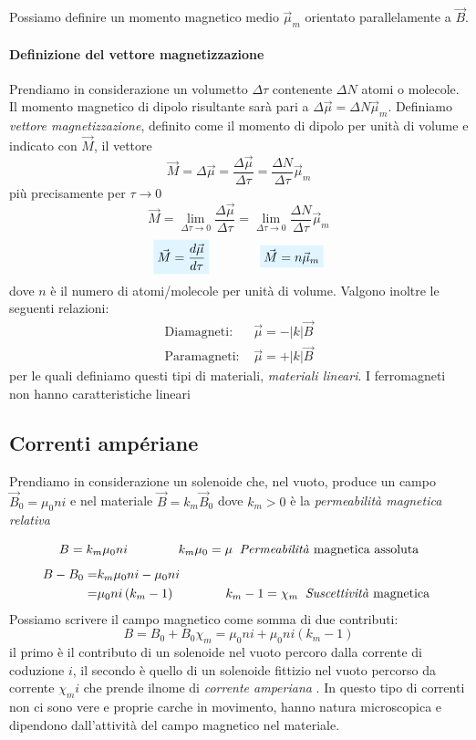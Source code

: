 \documentclass[x11names]{report}
\begin{document}
Possiamo definire un momento magnetico medio \(\vec{\mu}_m\) orientato parallelamente a \(\vec{B}\).

\paragraph{Definizione del vettore magnetizzazione}
Prendiamo in considerazione un volumetto \(\Delta\tau\) contenente \(\Delta N\) atomi o molecole. Il momento magnetico di dipolo risultante sarà pari a \(\Delta\vec{\mu} = \Delta N \vec{\mu}_m\). Definiamo \textit{vettore magnetizzazione}, definito come il momento di dipolo per unità di volume e indicato con \(\vec{M}\), il vettore
\[
\vec{M} = \Delta\vec{\mu} = \frac{\Delta \vec{\mu}}{\Delta\tau} =\frac{\Delta N}{\Delta\tau} \vec{\mu}_m
\]
più precisamente per \(\tau \to 0\)
\[
\vec{M} = \lim_{\Delta\tau \to 0}\frac{\Delta \vec{\mu}}{\Delta\tau} = \lim_{\Delta\tau \to 0}\frac{\Delta N}{\Delta\tau} \vec{\mu}_m
\]
\begin{equation}
	\viola{\vec{M}= \frac{d \vec{\mu}}{d\tau}} \qquad \qquad	\viola{\vec{M} = n\vec{\mu}_m}
\end{equation}
dove \(n\) è il numero di atomi/molecole per unità di volume. Valgono inoltre le seguenti relazioni:
\[
\begin{array}{rc}
	\text{Diamagneti: } & \vec{\mu} = - |k| \vec{B} \\
	\text{Paramagneti: } & \vec{\mu} = + |k| \vec{B}
\end{array}
\]
per le quali definiamo questi tipi di materiali, \textit{materiali lineari}. I ferromagneti non hanno caratteristiche lineari

\subsection{Correnti ampériane}
Prendiamo in considerazione un solenoide che, nel vuoto, produce un campo \(\vec{B}_0 = \mu_0 n i\) e nel materiale \(\vec{B} = k_m\vec{B}_0\) dove \(k_m > 0\) è la \textit{permeabilità magnetica relativa}

\begin{figure}[H]
	\centering
\end{figure}
\[
B = k_m \mu_0 n i \qquad \qquad k_m\mu_0 = \mu \: \text{ \textit{Permeabilità} magnetica assoluta} 
\]
\begin{align*}
	B - B_0 =&  k_m \mu_0 n i - \mu_0 n i \\
			=& \mu_0 n i\left(k_m -1\right) \qquad \qquad k_m - 1= \chi_m \: \text{ \textit{Suscettività} magnetica } \\
\end{align*}
Possiamo scrivere il campo magnetico come somma di due contributi:
\[
B = B_0  + B_0\chi_m = \mu_0 n i + \mu_0 n i\left(k_m -1\right)
\]
il primo è il contributo di un solenoide nel vuoto percoro dalla corrente di coduzione \(i\), il secondo è quello di un solenoide fittizio nel vuoto percorso da corrente \(\chi_m i\) che prende ilnome di \textit{corrente amperiana}	. In questo tipo di correnti non ci sono vere e proprie carche in movimento, hanno natura microscopica e dipendono dall'attività del campo magnetico nel materiale.
\end{document}
